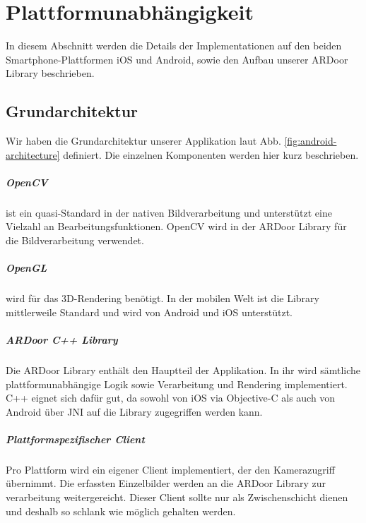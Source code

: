 \chapter{Plattformunabhängigkeit}

In diesem Abschnitt werden die Details der Implementationen auf den beiden Smartphone-Plattformen iOS und Android, sowie den Aufbau unserer ARDoor Library beschrieben.

\section{Grundarchitektur}
Wir haben die Grundarchitektur unserer Applikation laut Abb. \ref{fig:android-architecture} definiert. Die einzelnen Komponenten werden hier kurz beschrieben.

\paragraph{OpenCV}
ist ein quasi-Standard in der nativen Bildverarbeitung und unterstützt eine Vielzahl an Bearbeitungsfunktionen. OpenCV wird in der ARDoor Library für die Bildverarbeitung verwendet.

\paragraph{OpenGL}
wird für das 3D-Rendering benötigt. In der mobilen Welt ist die Library mittlerweile Standard und wird von Android und iOS unterstützt.

\paragraph{ARDoor C++ Library}
Die ARDoor Library enthält den Hauptteil der Applikation. In ihr wird sämtliche plattformunabhängige Logik sowie Verarbeitung und Rendering implementiert. C++ eignet sich  dafür gut, da sowohl von iOS via Objective-C als auch von Android über JNI auf die Library zugegriffen werden kann.

\paragraph{Plattformspezifischer Client}
Pro Plattform wird ein eigener Client implementiert, der den Kamerazugriff übernimmt. Die erfassten Einzelbilder werden an die ARDoor Library zur verarbeitung weitergereicht. Dieser Client sollte nur als Zwischenschicht dienen und deshalb so schlank wie möglich gehalten werden. 


